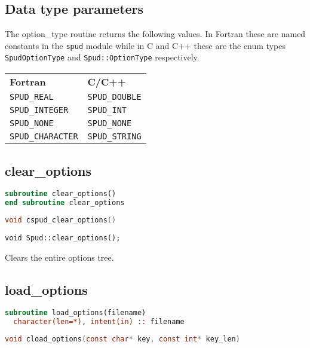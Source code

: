 \documentclass[a4paper, 11pt]{book}
\begin{document}
\subsection{Data type parameters}\label{sec:types}

The option\_type routine returns the following values. In Fortran these are
named constants in the \lstinline+spud+ module while in C and C++ these are
the enum types \lstinline+SpudOptionType+ and \lstinline+Spud::OptionType+
respectively.

\begin{tabular}{ll}
  \textbf{Fortran} & \textbf{C/C++} \\
  \lstinline+SPUD_REAL+ & \lstinline+SPUD_DOUBLE+\\
  \lstinline+SPUD_INTEGER+ & \lstinline+SPUD_INT+\\
  \lstinline+SPUD_NONE+ & \lstinline+SPUD_NONE+\\
  \lstinline+SPUD_CHARACTER+ & \lstinline+SPUD_STRING+
\end{tabular}

\subsection{clear\_options}

\begin{lstlisting}[language=fortran]
subroutine clear_options()
end subroutine clear_options
\end{lstlisting}

\begin{lstlisting}[language=C]
void cspud_clear_options()
\end{lstlisting}

\begin{lstlisting}
void Spud::clear_options();
\end{lstlisting}

Clears the entire options tree.

\subsection{load\_options}

\begin{lstlisting}[language=fortran]
subroutine load_options(filename)
  character(len=*), intent(in) :: filename
\end{lstlisting}

\begin{lstlisting}[language=C]
void cload_options(const char* key, const int* key_len)
\end{lstlisting}
\end{document}
